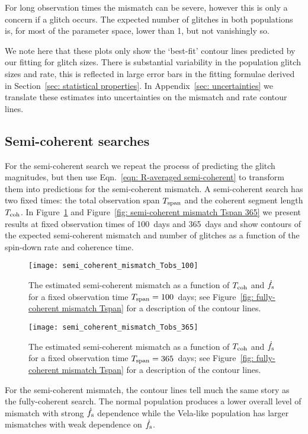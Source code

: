 \documentclass[../full_thesis/full_thesis.tex]{subfiles}
\begin{document}
For long observation times the mismatch can be severe, however this is only a
concern if a glitch occurs. The expected number of glitches in both populations
is, for most of the parameter space, lower than 1, but not vanishingly so.

We note here that these plots only show the `best-fit' contour lines predicted
by our fitting for glitch sizes. There is substantial variability in the population
glitch sizes and rate, this is reflected in large error bars in the fitting formulae
derived in Section~\ref{sec: statistical properties}. In Appendix~\ref{sec: uncertainties}
we translate these estimates into uncertainties on the mismatch and rate
contour lines.

\subsection{Semi-coherent searches}

For the semi-coherent search we repeat the process of predicting the glitch
magnitudes, but then use Eqn.~\eqref{eqn: R-averaged semi-coherent} to
transform them into predictions for the semi-coherent mismatch. A semi-coherent search has two
fixed times: the total observation span $T_{\mathrm{span}}$ and the coherent segment length
$T_{\mathrm{coh}}$. In Figure~\ref{fig: semi-coherent mismatch Tspan 100} and Figure~\ref{fig:
semi-coherent mismatch Tspan 365} we present results at fixed observation times
of 100~days and 365~days and show contours of the expected semi-coherent mismatch and number
of glitches as a function of the spin-down rate and coherence time.
\begin{figure}
\centering
\texttt{[image: semi\_coherent\_mismatch\_Tobs\_100]}
\caption{
The estimated semi-coherent mismatch as a function of $T_{\mathrm{coh}}$ and $\dot{f}_{\textrm{s}}$ for
a fixed observation time $T_{\mathrm{span}}=100$~days; see Figure~\ref{fig: fully-coherent
mismatch Tspan} for a description of the contour lines.}
\label{fig: semi-coherent mismatch Tspan 100}
\end{figure}
\begin{figure}
\centering
\texttt{[image: semi\_coherent\_mismatch\_Tobs\_365]}
\caption{
The estimated semi-coherent mismatch as a function of $T_{\mathrm{coh}}$ and $\dot{f}_{\textrm{s}}$ for
a fixed observation time $T_{\mathrm{span}}=365$~days; see Figure~\ref{fig: fully-coherent
mismatch Tspan} for a description of the contour lines.}
\label{fig: semi-coherent mismatch Tspan 365}
\end{figure}

For the semi-coherent mismatch, the contour lines tell much the same story as
the fully-coherent search. The normal population produces a lower overall level of
mismatch with strong $\dot{f}_{\textrm{s}}$ dependence while the Vela-like population has
larger mismatches with weak dependence on $\dot{f}_{\textrm{s}}$.
\end{document}
